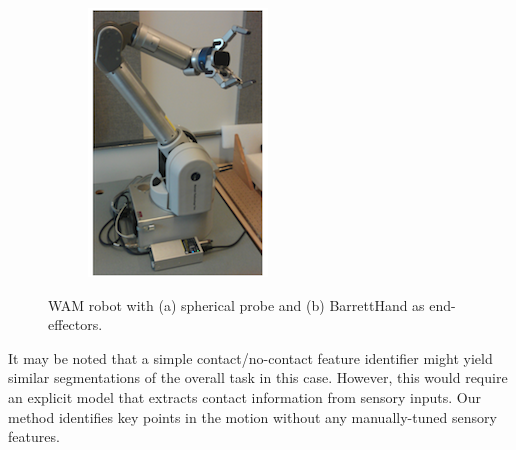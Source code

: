 \begin{figure}[]
\begin{subfigure}[]{0.438\linewidth}
        \caption{}
    \end{subfigure}
    \begin{subfigure}[]{0.490\linewidth}
        \includegraphics[width=\linewidth]{images/wam_h}
        \caption{}
    \end{subfigure}
    \caption{WAM robot with (a) spherical probe and (b) BarrettHand as end-effectors.}
    \label{fig:wam}
\end{figure}

It may be noted that a simple contact/no-contact feature identifier might yield similar segmentations of the overall task in this case.
However, this would require an explicit model that extracts contact information from sensory inputs.
Our method identifies key points in the motion without any manually-tuned sensory features.

